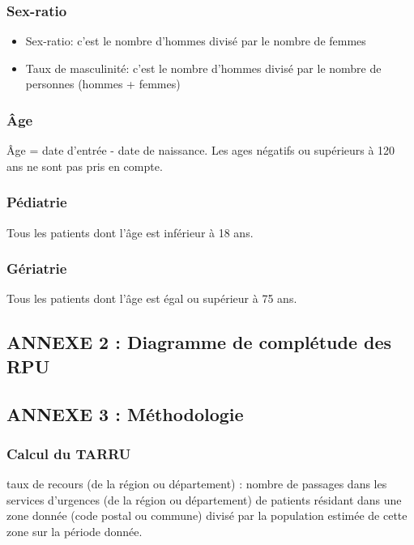 \documentclass[]{article}
\begin{document}
\subsubsection{Sex-ratio}\label{sex-ratio}

\begin{itemize}
\itemsep1pt\parskip0pt
\item
  Sex-ratio: c'est le nombre d'hommes divisé par le nombre de femmes
\item
  Taux de masculinité: c'est le nombre d'hommes divisé par le nombre de
  personnes (hommes + femmes)
\end{itemize}

\subsubsection{Âge}\label{age}

Âge = date d'entrée - date de naissance. Les ages négatifs ou supérieurs
à 120 ans ne sont pas pris en compte.

\subsubsection{Pédiatrie}\label{pediatrie}

Tous les patients dont l'âge est inférieur à 18 ans.

\subsubsection{Gériatrie}\label{geriatrie}

Tous les patients dont l'âge est égal ou supérieur à 75 ans.

\subsection{ANNEXE 2 : Diagramme de complétude des
RPU}\label{annexe-2-diagramme-de-completude-des-rpu}

\subsection{ANNEXE 3 : Méthodologie}\label{annexe-3-methodologie}

\subsubsection{Calcul du TARRU}\label{calcul-du-tarru}

taux de recours (de la région ou département) : nombre de passages dans
les services d'urgences (de la région ou département) de patients
résidant dans une zone donnée (code postal ou commune) divisé par la
population estimée de cette zone sur la période donnée.
\end{document}
